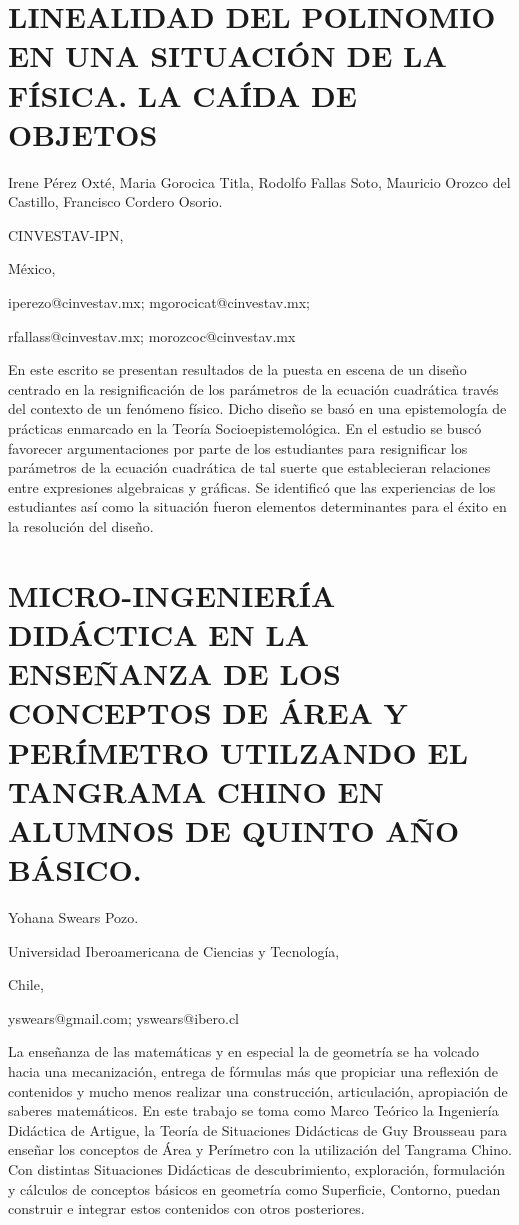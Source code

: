 \section{LINEALIDAD DEL POLINOMIO EN UNA SITUACIÓN DE LA FÍSICA. LA CAÍDA
DE OBJETOS}

\begin{datos}

Irene Pérez Oxté, Maria Gorocica Titla, Rodolfo Fallas Soto, Mauricio
Orozco del Castillo, Francisco Cordero Osorio.

CINVESTAV-IPN,

México,

iperezo@cinvestav.mx; mgorocicat@cinvestav.mx;

rfallass@cinvestav.mx; morozcoc@cinvestav.mx

\end{datos}

En este escrito se presentan resultados de la puesta en escena de
un diseño centrado en la resignificación de los parámetros de la ecuación
cuadrática través del contexto de un fenómeno físico. Dicho diseño
se basó en una epistemología de prácticas enmarcado en la Teoría Socioepistemológica.
En el estudio se buscó favorecer argumentaciones por parte de los
estudiantes para resignificar los parámetros de la ecuación cuadrática
de tal suerte que establecieran relaciones entre expresiones algebraicas
y gráficas. Se identificó que las experiencias de los estudiantes
así como la situación fueron elementos determinantes para el éxito
en la resolución del diseño.

\setcounter{section}{222}


\section{MICRO-INGENIERÍA DIDÁCTICA EN LA ENSEÑANZA DE LOS CONCEPTOS DE ÁREA
Y PERÍMETRO UTILZANDO EL TANGRAMA CHINO EN ALUMNOS DE QUINTO AÑO BÁSICO.}

\begin{datos}

Yohana Swears Pozo.

Universidad Iberoamericana de Ciencias y Tecnología,

Chile,

yswears@gmail.com; yswears@ibero.cl 

\end{datos}

La enseñanza de las matemáticas y en especial la de geometría se ha
volcado hacia una mecanización, entrega de fórmulas más que propiciar
una reflexión de contenidos y mucho menos realizar una construcción,
articulación, apropiación de saberes matemáticos. En este trabajo
se toma como Marco Teórico la Ingeniería Didáctica de Artigue, la
Teoría de Situaciones Didácticas de Guy Brousseau para enseñar los
conceptos de Área y Perímetro con la utilización del Tangrama Chino.
Con distintas Situaciones Didácticas de descubrimiento, exploración,
formulación y cálculos de conceptos básicos en geometría como Superficie,
Contorno, puedan construir e integrar estos contenidos con otros posteriores.


